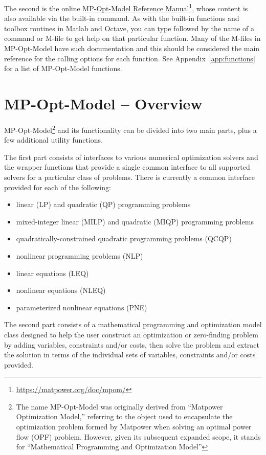 \documentclass[12pt]{article}
\newcommand{\matlab}[0]{{\sc Matlab}}
\newcommand{\matpower}[0]{{\sc Matpower}}
\newcommand{\mpom}[0]{\mbox{MP-Opt-Model}}
\newcommand{\code}[1]{{\relsize{-0.5}{\tt{{#1}}}}}  %
\numberwithin{equation}{section}
\numberwithin{table}{section}
\numberwithin{figure}{section}
\begin{document}
The second is the online \href{https://matpower.org/doc/mpom/}{\mpom{} Reference Manual}\footnote{\url{https://matpower.org/doc/mpom/}}, whose content is also available via the built-in \code{help} command. As with the built-in functions and toolbox routines in \matlab{} and Octave, you can type \code{help} followed by the name of a command or M-file to get help on that particular function. Many of the M-files in \mpom{} have such documentation and this should be considered the main reference for the calling options for each function. See Appendix~\ref{app:functions} for a list of \mpom{} functions.

\clearpage
\section{\mpom{} -- Overview}
\label{sec:mpom}

\mpom{}\footnote{The name \mpom{} was originally derived from ``\matpower{} Optimization Model,'' referring to the object used to encapsulate the optimization problem formed by \matpower{} when solving an optimal power flow (OPF) problem. However, given its subsequent expanded scope, it stands for ``Mathematical Programming and Optimization Model''} and its functionality can be divided into two main parts, plus a few additional utility functions.

The first part consists of interfaces to various numerical optimization solvers and the wrapper functions that provide a single common interface to all supported solvers for a particular class of problems. There is currently a common interface provided for each of the following:
\begin{itemize}
\item linear (LP) and quadratic (QP) programming problems
\item mixed-integer linear (MILP) and quadratic (MIQP) programming problems
\item quadratically-constrained quadratic programming problems (QCQP)
\item nonlinear programming problems (NLP)
\item linear equations (LEQ)
\item nonlinear equations (NLEQ)
\item parameterized nonlinear equations (PNE)
\end{itemize}

The second part consists of a mathematical programming and optimization model class designed to help the user construct an optimization or zero-finding problem by adding variables, constraints and/or costs, then solve the problem and extract the solution in terms of the individual sets of variables, constraints and/or costs provided.
\end{document}
